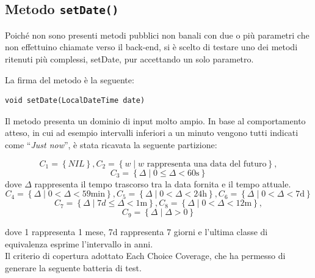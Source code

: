 \begin{listing}[!ht]
\begin{verbatim}

\end{verbatim}
\end{listing}

\subsection{Metodo \texttt{setDate()}}
Poiché non sono presenti metodi pubblici non banali con due o 
più parametri che non effettuino chiamate verso il back-end, si 
è scelto di testare uno dei metodi ritenuti più complessi, setDate, 
pur accettando un solo parametro.

\noindent La firma del metodo è la seguente:

\begin{minipage}{\linewidth}
\centering\begin{verbatim}
void setDate(LocalDateTime date)
\end{verbatim}
\end{minipage}

Il metodo presenta un dominio di input molto ampio. In base al 
comportamento atteso, in cui ad esempio intervalli inferiori a un minuto 
vengono tutti indicati come “\textit{Just now}”, è stata ricavata la seguente partizione:

\noindent$$C_{1} =\left\{NIL\right\},
C_2 = \left\{ w \mid w \text{ rappresenta una data del futuro}\right\},$$
$$C_3 = \left\{ \Delta \mid 0 \le \Delta < 60\text{s} \right\}$$
dove $\Delta$ rappresenta il tempo trascorso tra la data fornita e il tempo attuale.
$$C_4 = \left\{ \Delta \mid 0 < \Delta < 59\text{min} \right\},
C_5 = \left\{ \Delta \mid 0 <  \Delta < 24\text{h} \right\},
C_6 = \left\{ \Delta \mid 0 <  \Delta < 7\text{d} \right\}$$
$$C_7 = \left\{ \Delta \mid 7d \le \Delta < 1\text{m} \right\},
C_8 = \left\{ \Delta \mid 0 < \Delta < 12\text{m} \right\},$$
$$C_9 = \left\{ \Delta \mid \Delta > 0 \right\}$$

dove 1 rappresenta 1 mese, 7d rappresenta 7 giorni e l'ultima classe di equivalenza
esprime l'intervallo in anni. \\
\indent Il criterio di copertura adottato Each Choice Coverage, che ha permesso di generare la
seguente batteria di test.


